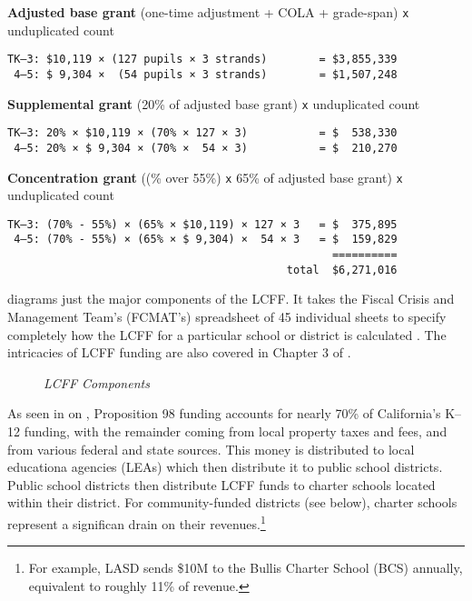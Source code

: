 \noindent\textbf{Adjusted base grant} \hfill{}(one-time adjustment + COLA + grade-span) \texttt{x} unduplicated count
\OnehalfSpacing%
\begin{verbatim}
TK–3: $10,119 × (127 pupils × 3 strands)        = $3,855,339
 4–5: $ 9,304 ×  (54 pupils × 3 strands)        = $1,507,248
\end{verbatim}
\noindent\textbf{Supplemental grant} \hfill(20\% of adjusted base grant) \texttt{x} unduplicated count
\OnehalfSpacing%
\begin{verbatim}
TK–3: 20% × $10,119 × (70% × 127 × 3)           = $  538,330
 4–5: 20% × $ 9,304 × (70% ×  54 × 3)           = $  210,270
\end{verbatim}
\noindent\textbf{Concentration grant} \hfill{}((\% over 55\%) \texttt{x} 65\% of adjusted base grant) \texttt{x} unduplicated count
\OnehalfSpacing%
\begin{verbatim}
TK–3: (70% - 55%) × (65% × $10,119) × 127 × 3   = $  375,895
 4–5: (70% - 55%) × (65% × $ 9,304) ×  54 × 3   = $  159,829
                                                  ==========
                                           total  $6,271,016
\end{verbatim}

 diagrams just the major components of the LCFF. It takes the Fiscal Crisis and Management Team's (FCMAT's) spreadsheet of 45 individual sheets to specify completely how the LCFF for a particular school or district is calculated \parencite{FCMAT2024}. The intricacies of LCFF funding are also covered in Chapter 3 of \textcite[35–58]{Aguinaldo.etal2022}.

\begin{figure}[htb]
  \caption[LCFF Components]{\textit{LCFF Components}}\label{fig:lcff_components}%
\end{figure}

As seen in  on \pageref{fig:2019–20_K–12_Funding}, Proposition 98 funding accounts for nearly 70\% of California's K–12 funding, with the remainder coming from local property taxes and fees, and from various federal and state sources. This money is distributed to local educationa agencies (LEAs) which then distribute it to public school districts. Public school districts then distribute LCFF funds to charter schools located within their district. For community-funded districts (see below), charter schools represent a significan drain on their revenues.\footnote{For example, LASD sends \$10M to the Bullis Charter School (BCS) annually, equivalent to roughly 11\% of revenue.}

